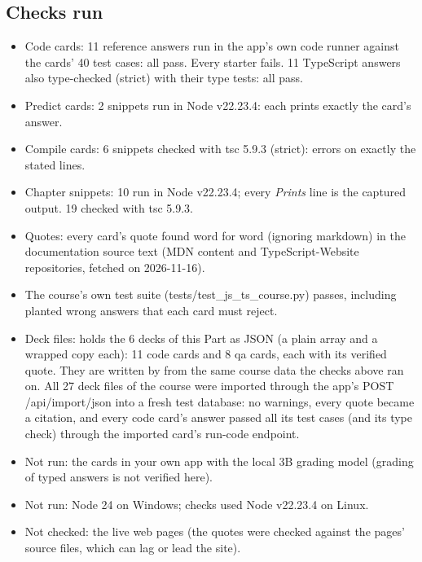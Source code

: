\documentclass[10pt]{article}
\newcommand{\code}[1]{{\ttfamily\small #1}}
\begin{document}
\subsection*{Checks run}
{\footnotesize\begin{itemize}
\item Code cards: 11 reference answers run in the app's own code runner against the cards' 40 test cases: all pass. Every starter fails. 11 TypeScript answers also type-checked (strict) with their type tests: all pass.
\item Predict cards: 2 snippets run in Node v22.23.4: each prints exactly the card's answer.
\item Compile cards: 6 snippets checked with tsc 5.9.3 (strict): errors on exactly the stated lines.
\item Chapter snippets: 10 run in Node v22.23.4; every \textit{Prints} line is the captured output. 19 checked with tsc 5.9.3.
\item Quotes: every card's quote found word for word (ignoring markdown) in the documentation source text (MDN content and TypeScript-Website repositories, fetched on 2026-11-16).
\item The course's own test suite (\code{tests/test\_js\_ts\_course.py}) passes, including planted wrong answers that each card must reject.
\item Deck files:  holds the 6 decks of this Part as JSON (a plain array and a wrapped copy each): 11 code cards and 8 qa cards, each with its verified quote. They are written by  from the same course data the checks above ran on. All 27 deck files of the course were imported through the app's \code{POST /api/import/json} into a fresh test database: no warnings, every quote became a citation, and every code card's answer passed all its test cases (and its type check) through the imported card's run-code endpoint.
\item Not run: the cards in your own app with the local 3B grading model (grading of typed answers is not verified here).
\item Not run: Node 24 on Windows; checks used Node v22.23.4 on Linux.
\item Not checked: the live web pages (the quotes were checked against the pages' source files, which can lag or lead the site).
\end{itemize}}
\end{document}
